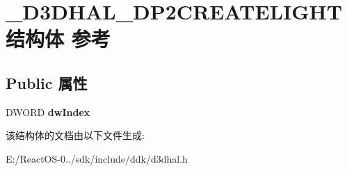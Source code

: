 \hypertarget{struct___d3_d_h_a_l___d_p2_c_r_e_a_t_e_l_i_g_h_t}{}\section{\+\_\+\+D3\+D\+H\+A\+L\+\_\+\+D\+P2\+C\+R\+E\+A\+T\+E\+L\+I\+G\+H\+T结构体 参考}
\label{struct___d3_d_h_a_l___d_p2_c_r_e_a_t_e_l_i_g_h_t}
\subsection*{Public 属性}
\begin{DoxyCompactItemize}
\item 
\mbox{\label{struct___d3_d_h_a_l___d_p2_c_r_e_a_t_e_l_i_g_h_t_ab912313ad4b5ed1dba2acb17300f5a85}} 
D\+W\+O\+RD {\bfseries dw\+Index}
\end{DoxyCompactItemize}


该结构体的文档由以下文件生成\+:\begin{DoxyCompactItemize}
\item 
E\+:/\+React\+O\+S-\/0../sdk/include/ddk/d3dhal.\+h\end{DoxyCompactItemize}
